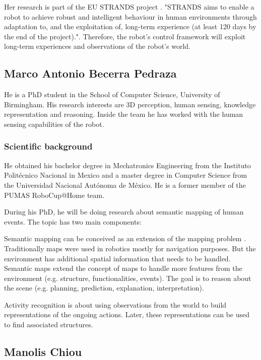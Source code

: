 Her research is part of the EU STRANDS project \cite{strands}. "STRANDS aims to enable a robot to achieve robust and intelligent behaviour in human environments through adaptation to, and the exploitation of, long-term experience (at least 120 days by the end of the project).". Therefore, the robot's control framework will exploit long-term experiences and observations of the robot's world. 

\subsection{Marco Antonio Becerra Pedraza}

He is a PhD student in the School of Computer Science, University of Birmingham. His research interests are 3D perception, human sensing, knowledge representation and reasoning. Inside the team he has worked with the human sensing capabilities of the robot.

\subsubsection*{Scientific background}
He obtained his bachelor degree in Mechatronics Engineering from the Instituto Polit\'{e}cnico Nacional in Mexico and a master degree in Computer Science from the Universidad Nacional Aut\'{o}noma de M\'{e}xico. He is a former member of the PUMAS RoboCup@Home team.

During his PhD, he will be doing research about semantic mapping of human events. The topic has two main components:

Semantic mapping can be conceived as an extension of the mapping problem \cite{Nuchter08_TowardsSemanticMaps}. Traditionally maps were used in robotics mostly for navigation purposes. But the environment has additional spatial information that needs to be handled. Semantic maps extend the concept of maps to handle more features from the environment (e.g. structure, functionalities, events). The goal is to reason about the scene (e.g. planning, prediction, explanation, interpretation).

Activity recognition is about using observations from the world to build representations of the ongoing actions. Later, these representations can be used to find associated structures.

\subsection{Manolis Chiou}

